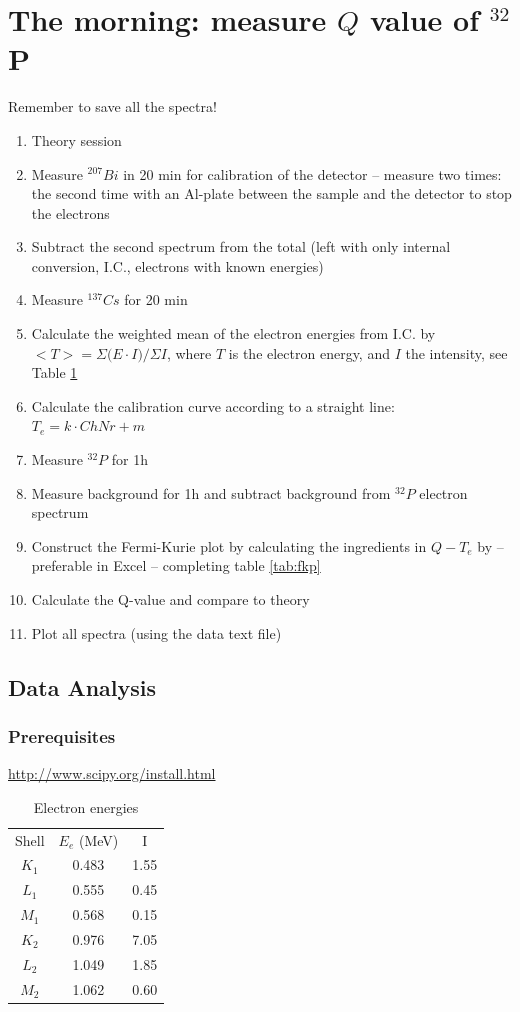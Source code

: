 \documentclass[a4,11pt, notitlepage]{article}
\begin{document}
\section{The morning: measure $Q$ value of $^{32}$P}
Remember to save all the spectra!
\begin{enumerate}
\item Theory session 
\item Measure $^{207}Bi$ in 20 min for calibration of the detector -- measure two times: the second time with an Al-plate between the sample and the detector to stop the electrons 
\item Subtract the second spectrum from the total (left with only internal conversion, I.C., electrons with known energies)
\item Measure $^{137}Cs$ for 20 min
\item Calculate the weighted mean of the electron energies from I.C. by $<T>=\Sigma{(E\cdot I})/\Sigma{I}$, where $T$ is the electron energy, and $I$ the intensity, see Table \ref{tab:calib}
\item Calculate the calibration curve according to a straight line: $T_e=k\cdot ChNr+m$ 
\item  Measure $^{32}P$ for 1h 
\item Measure background for 1h and subtract background from $^{32}P$ electron spectrum
\item Construct the Fermi-Kurie plot by calculating the ingredients in $Q-T_e$ by -- preferable in Excel -- completing table \ref{tab:fkp}

\item Calculate the Q-value and compare to theory
\item Plot all spectra (using the data text file)

\end{enumerate}

\subsection{Data Analysis}
\label{sec:data-analysis}

\subsubsection{Prerequisites}
\label{sec:prerequisites}
\url{http://www.scipy.org/install.html}



\begin{table}[]
\caption{Electron energies}
\label{tab:calib}
\centering
\begin{tabular}{ccc}
Shell & $E_{e}$ (MeV) & I \\
$K_1$ & 0.483 & 1.55 \\
$L_1$ & 0.555 & 0.45 \\
$M_1$ & 0.568 & 0.15 \\
$K_2$ & 0.976 & 7.05 \\
$L_2$ & 1.049 & 1.85 \\
$M_2$ & 1.062 & 0.60 
\end{tabular}
\end{table}
\end{document}
